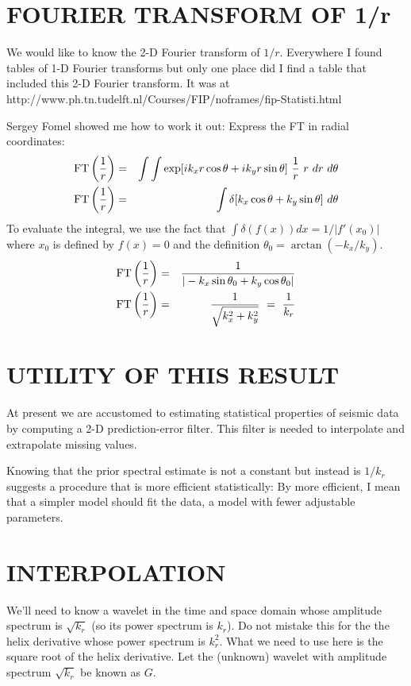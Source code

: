 \section{FOURIER TRANSFORM OF 1/r}
We would like to know the 2-D Fourier transform
of $1/r$.
Everywhere I found tables of 1-D Fourier transforms but only
one place did I find a table that included this 2-D Fourier transform.
It was at
        http://www.ph.tn.tudelft.nl/Courses/FIP/noframes/fip-Statisti.html
\par
Sergey Fomel showed me how to work it out:
Express the FT in radial coordinates:
\def\FT{{\rm FT}\left({1\over r}\right)}
\begin{eqnarray}
\FT &=& \int \int \exp[i k_x r \cos\theta + i k_y r \sin\theta]\
        {1\over r}\ r \ dr \ d\theta   \\
\FT &=& \int \delta[k_x \cos\theta + k_y \sin\theta]\ d\theta
\end{eqnarray}
        To evaluate the integral, we use the fact that
        $\int\delta(f(x))dx = 1/|f'(x_0)|$ where $x_0$ is defined by $f(x)=0$
        and the definition
        $ \theta_0 =\arctan (-k_x/k_y)$.
\begin{eqnarray}
\FT &=&
{1\over |-k_x \sin\theta_0 + k_y \cos\theta_0|}
\\
\FT &=&
{1\over\sqrt{k_x^2 + k_y^2}} \ =\  {1\over k_r} 
\end{eqnarray}





\section{UTILITY OF THIS RESULT}
At present we are accustomed to estimating
statistical properties of seismic data
by computing a 2-D prediction-error filter.
This filter is needed to interpolate and extrapolate missing values.

\par
Knowing that the prior spectral estimate is not a constant
but instead is $1/k_r$ suggests a procedure
that is
more efficient
statistically:
By more efficient,
I mean that a simpler model should fit the data,
a model with fewer adjustable parameters.

\section{INTERPOLATION}
\par
We'll need to know a wavelet in the time and space domain
whose amplitude spectrum is
$\sqrt{k_r}$
(so its power spectrum is $k_r$).
Do not mistake this for the the helix derivative \cite{geofizhelix}
whose power spectrum is $k_r^2$.
What we need to use here is the square root of the helix derivative.
Let the (unknown) wavelet with 
amplitude spectrum
$\sqrt{k_r}$
be known as $G$.


